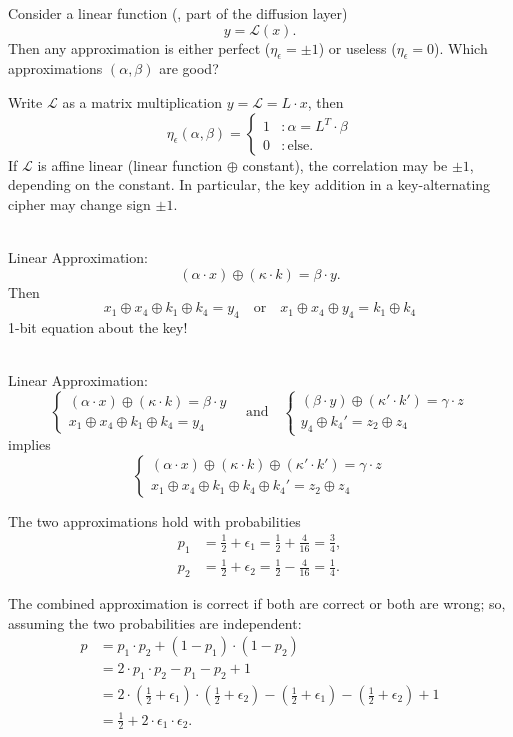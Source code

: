 Consider a linear function (\eg, part of the diffusion layer) \[
y=\mathcal{L}(x).
\] Then any approximation is either perfect ($\eta_\epsilon=\pm 1$) or useless ($\eta_\epsilon=0$). Which approximations $(\alpha,\beta)$ are good?

Write $\mathcal{L}$ as a matrix multiplication $y=\mathcal{L}=L\cdot x$, then \[
\eta_\epsilon(\alpha,\beta)=\begin{cases}
	1 &: \alpha=L^T\cdot\beta \\
	0 &: \text{else}.
\end{cases}
\] If $\mathcal{L}$ is affine linear (linear function $\oplus$ constant), the correlation may be $\pm 1$, depending on the constant. In particular, the key addition in a key-alternating cipher may change sign $\pm 1$.

\\
Linear Approximation: \[
(\alpha\cdot x)\oplus(\kappa\cdot k)=\beta\cdot y.
\]
Then \[
x_1\oplus x_4\oplus k_1\oplus k_4 = y_4\quad\text{or}\quad x_1\oplus x_4\oplus y_4 =k_1\oplus k_4
\]
1-bit equation about the key!

\\
Linear Approximation: \[
\begin{cases}
(\alpha\cdot x)\oplus(\kappa\cdot k)=\beta\cdot y\\
x_1\oplus x_4\oplus k_1\oplus k_4 = y_4
\end{cases}\quad\text{and}\quad\begin{cases}
(\beta\cdot y)\oplus(\kappa'\cdot k')=\gamma\cdot z\\
y_4\oplus k_4'=z_2\oplus z_4
\end{cases}
\] implies \[
\begin{cases}
(\alpha\cdot x)\oplus(\kappa\cdot k)\oplus(\kappa'\cdot k')=\gamma\cdot z\\
x_1\oplus x_4\oplus k_1\oplus k_4\oplus k_4' = z_2\oplus z_4
\end{cases}
\]


The two approximations hold with probabilities \begin{align*}
p_1&=\frac{1}{2}+\epsilon_1=\frac{1}{2}+\frac{4}{16}=\frac{3}{4},\\
p_2&=\frac{1}{2}+\epsilon_2=\frac{1}{2}-\frac{4}{16}=\frac{1}{4}.
\end{align*}

The combined approximation is correct if  both are correct or both are wrong; so, assuming the two probabilities are independent:
\begin{align*}
p &= p_1\cdot p_2 + (1-p_1)\cdot(1-p_2)\\
&= 2\cdot p_1\cdot p_2-p_1-p_2+1\\
&= 2\cdot\left(\frac{1}{2}+\epsilon_1\right)\cdot\left(\frac{1}{2}+\epsilon_2\right)-\left(\frac{1}{2}+\epsilon_1\right)-\left(\frac{1}{2}+\epsilon_2\right)+1\\
&=\frac{1}{2}+2\cdot\epsilon_1\cdot\epsilon_2.
\end{align*}

